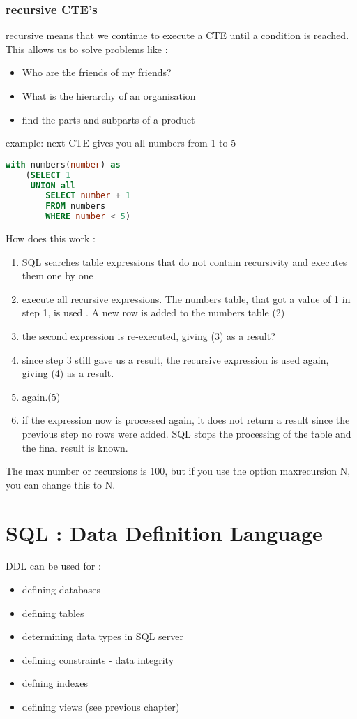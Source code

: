 \documentclass{report}
\begin{document}
	\subsection{recursive CTE's}
	recursive means that we continue to execute a CTE until a condition is reached.
	This allows us to solve problems like : 
	\begin{itemize}
		\item Who are the friends of my friends?
		\item What is the hierarchy of an organisation
		\item find the parts and subparts of a product
	\end{itemize}
	example: next CTE gives you all numbers from 1 to 5
	\begin{lstlisting}[language=sql]
with numbers(number) as 
	(SELECT 1
	 UNION all
	 	SELECT number + 1
	 	FROM numbers
	 	WHERE number < 5)\end{lstlisting}
	 How does this work : 
	 \begin{enumerate}
	 	\item SQL searches table expressions that do not contain recursivity and executes them one by one
	 	\item execute all recursive expressions. The numbers table, that got a value of 1 in step 1, is used . A new row is added to the numbers table (2)
	 	\item the second expression is re-executed, giving (3) as a result?
	 	\item since step 3 still gave us a result, the recursive expression is used again, giving (4) as a result. 
	 	\item again.(5)
	 	\item if the expression now is processed again, it does not return a result since the previous step no rows were added. SQL stops the processing of the table and the final result is known.
	 \end{enumerate}
 	The max number or recursions is 100, but if you use the option maxrecursion N, you can change this to N. 
 	
 	\chapter{SQL : Data Definition Language}
 	DDL can be used for : 
 	\begin{itemize}
 		\item defining databases
 		\item defining tables
 		\item determining data types in SQL server
 		\item defining constraints - data integrity
 		\item defning indexes 
 		\item defining views (see previous chapter)
 	\end{itemize}
 \pagebreak
\end{document}
